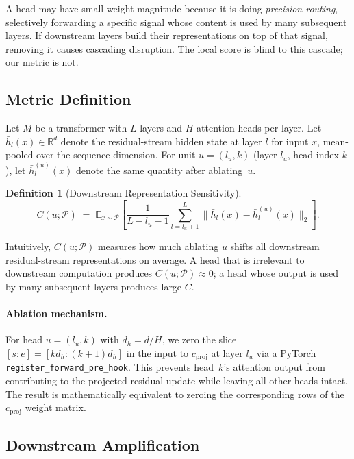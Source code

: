 \documentclass[11pt,a4paper]{article}
\newcommand{\R}{\mathbb{R}}
\newcommand{\E}{\mathbb{E}}
\newcommand{\hb}{\bar{h}}
\theoremstyle{definition}
\newtheorem{definition}{Definition}[section]
\theoremstyle{plain}
\begin{document}
A head may have small weight magnitude because it is doing
\emph{precision routing}, selectively forwarding a specific signal whose
content is used by many subsequent layers.
If downstream layers build their representations on top of that signal,
removing it causes cascading disruption.
The local score is blind to this cascade; our metric is not.

\subsection{Metric Definition}
\label{sec:definition}

Let $M$ be a transformer with $L$ layers and $H$ attention heads per layer.
Let $\hb_l(x) \in \R^{d}$ denote the residual-stream hidden state at
layer $l$ for input $x$, mean-pooled over the sequence dimension.
For unit $u = (l_u, k)$ (layer $l_u$, head index $k$), let
$\hb_l^{(u)}(x)$ denote the same quantity after ablating~$u$.

\begin{definition}[Downstream Representation Sensitivity]
\label{def:bridge}
\begin{equation}
    C(u;\mathcal{P}) \;=\;
    \E_{x \sim \mathcal{P}}\!\left[
        \frac{1}{L - l_u - 1}
        \sum_{l=l_u+1}^{L}
        \bigl\| \hb_l(x) - \hb_l^{(u)}(x) \bigr\|_2
    \right].
    \label{eq:bridge}
\end{equation}
\end{definition}

Intuitively, $C(u;\mathcal{P})$ measures how much ablating $u$ shifts all
downstream residual-stream representations on average.
A head that is irrelevant to downstream computation produces
$C(u;\mathcal{P}) \approx 0$; a head whose output is used by many
subsequent layers produces large $C$.

\paragraph{Ablation mechanism.}
For head $u=(l_u,k)$ with $d_h = d/H$, we zero the slice
$[s\!:\!e] = [k d_h\!:\!(k\!+\!1)d_h]$ in the input to
$c_{\text{proj}}$ at layer $l_u$ via a PyTorch
\texttt{register\_forward\_pre\_hook}.
This prevents head~$k$'s attention output from contributing to the
projected residual update while leaving all other heads intact.
The result is mathematically equivalent to zeroing the corresponding rows
of the $c_{\text{proj}}$ weight matrix.

\subsection{Downstream Amplification}
\label{sec:amp_def}
\end{document}
